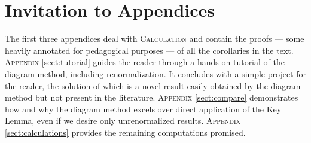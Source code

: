 \documentclass{article}
\theoremstyle{plain}
\theoremstyle{definition}
\begin{document}


    
    


\renewcommand{\thesection}{\Alph{section}}
\setcounter{section}{0}

\section*{Invitation to Appendices}
    The first three appendices deal with \textsc{Calculation} and contain the
    proofs --- some heavily annotated for pedagogical purposes --- of all the
    corollaries in the text.
    \textsc{Appendix} \ref{sect:tutorial} guides the reader through a hands-on
        tutorial of the diagram method, including renormalization.  It
        concludes with a simple project for the reader, the solution of which
        is a novel result easily obtained by the diagram method but not present
        in the literature. 
    \textsc{Appendix} \ref{sect:compare} demonstrates how and why the diagram
        method excels over direct application of the Key Lemma, even if we
        desire only unrenormalized results.
    \textsc{Appendix} \ref{sect:calculations} provides the remaining
        computations promised.
\end{document}
